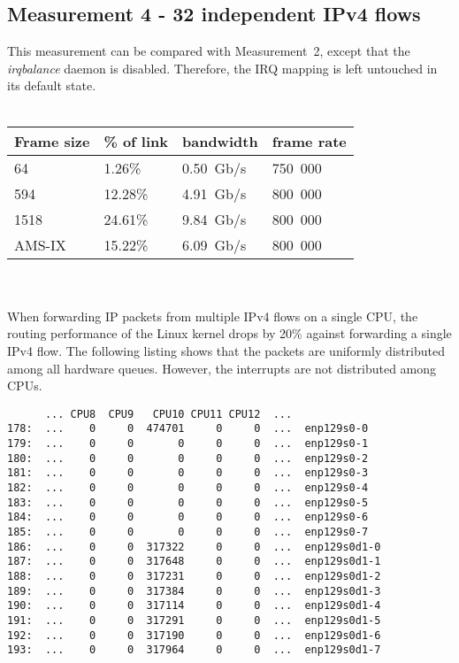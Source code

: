 
\subsection{Measurement 4 - 32 independent IPv4 flows}
This measurement can be compared with Measurement~2, except that the {\it{irqbalance}} daemon is disabled.
Therefore, the IRQ mapping is left untouched in its default state.
\\
\\
\begin{tabular}{ | l | l | l | l | }
\hline
Frame size & \% of link & bandwidth & frame rate \\
\hline
64     &  1.26\% &  0.50~Gb/s & 750~000 \\
594    & 12.28\% &  4.91~Gb/s & 800~000 \\
1518   & 24.61\% &  9.84~Gb/s & 800~000 \\
AMS-IX & 15.22\% &  6.09~Gb/s & 800~000 \\
\hline
\end{tabular}
\\
\\
When forwarding IP packets from multiple IPv4 flows on a single CPU,
the routing performance of the Linux kernel drops by 20\% against forwarding a single IPv4 flow.
The following listing shows that
the packets are uniformly distributed among all hardware queues.
However, the interrupts are not distributed among CPUs.
\begin{lstlisting}
      ... CPU8  CPU9   CPU10 CPU11 CPU12  ...
178:  ...    0     0  474701     0     0  ...  enp129s0-0
179:  ...    0     0       0     0     0  ...  enp129s0-1
180:  ...    0     0       0     0     0  ...  enp129s0-2
181:  ...    0     0       0     0     0  ...  enp129s0-3
182:  ...    0     0       0     0     0  ...  enp129s0-4
183:  ...    0     0       0     0     0  ...  enp129s0-5
184:  ...    0     0       0     0     0  ...  enp129s0-6
185:  ...    0     0       0     0     0  ...  enp129s0-7
186:  ...    0     0  317322     0     0  ...  enp129s0d1-0
187:  ...    0     0  317648     0     0  ...  enp129s0d1-1
188:  ...    0     0  317231     0     0  ...  enp129s0d1-2
189:  ...    0     0  317384     0     0  ...  enp129s0d1-3
190:  ...    0     0  317114     0     0  ...  enp129s0d1-4
191:  ...    0     0  317291     0     0  ...  enp129s0d1-5
192:  ...    0     0  317190     0     0  ...  enp129s0d1-6
193:  ...    0     0  317964     0     0  ...  enp129s0d1-7
\end{lstlisting}
